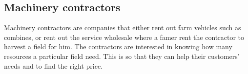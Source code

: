 \subsection{Machinery contractors}
Machinery contractors are companies that either rent out farm vehicles such as combines, or rent out the service wholesale where a famer rent the contractor to harvest a field for him. The contractors are interested in knowing how many resources a particular field need. This is so that they can help their customers’ needs and to find the right price. 
